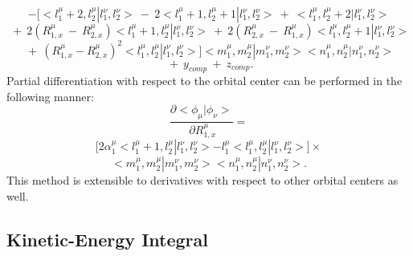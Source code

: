 \[
-\bigg[
<l_1^\mu +2,l_2^\mu |l_1^\nu ,l_2^\nu >\ -\ 2<l_1^\mu +1,l_2^\mu +1|l_1^\nu
,l_2^\nu >\ +\ <l_1^\mu ,l_2^\mu +2|l_1^\nu ,l_2^\nu >
\]
\[
\ +\ 2(R_{1,x}^\mu \ -\ R_{2,x}^\mu )<l_1^\mu +1,l_2^\mu |l_1^\nu ,l_2^\nu
>\ +\ 2(R_{2,x}^\mu \ -\ R_{1,x}^\mu )<l_1^\mu ,l_2^\mu +1|l_1^\nu ,l_2^\nu >
\]
\[
\ +\ (R_{1,x}^\mu -R_{2,x}^\mu )^2<l_1^\mu ,l_2^\mu |l_1^\nu ,l_2^\nu >%
\bigg]  
<m_1^\mu ,m_2^\mu |m_1^\nu ,m_2^\nu ><n_1^\mu ,n_2^\mu |n_1^\nu ,n_2^\nu >
\]
\begin{equation}
\ +\ y_{comp}\ +\ z_{comp}.
\end{equation}
Partial differentiation with respect to the orbital center can be performed
in the following manner: 
\[
{\frac{{\partial <\phi _\mu |\phi _\nu >}}{{\ \partial R_{1,x}^\mu }}}=
\]
\[
\lbrack 2\alpha _1^\mu <l_1^\mu +1,l_2^\mu |l_1^\nu ,l_2^\nu >-l_1^\mu
<l_1^\mu ,l_2^\mu |l_1^\nu ,l_2^\nu >]\times 
\]
\begin{equation}
<m_1^\mu ,m_2^\mu |m_1^\nu ,m_2^\nu ><n_1^\mu ,n_2^\mu |n_1^\nu ,n_2^\nu >.
\end{equation}
This method is extensible to derivatives with respect to other orbital
centers as well.

\subsection{Kinetic-Energy Integral}

